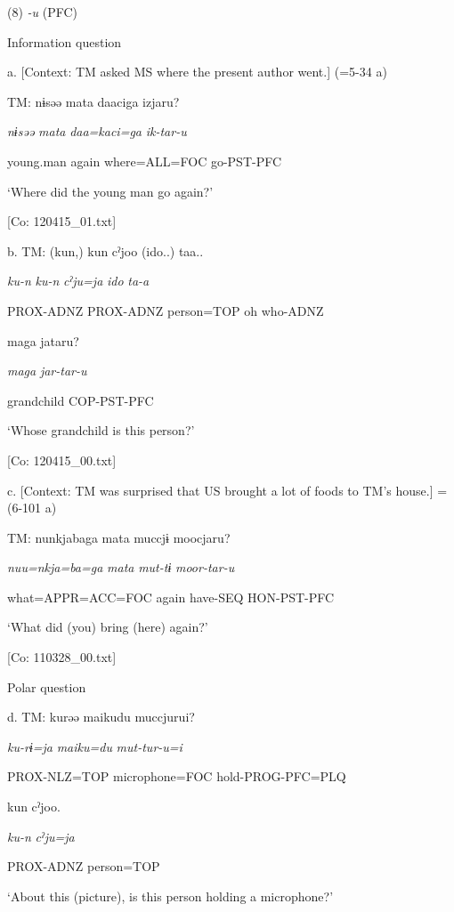 (8)  \textit{{}-u} (PFC)

  Information question

  a.  [Context: TM asked MS where the present author went.] (=5-34 a)

    TM:  nɨsəə  mata  daaciga  izjaru?

      \textit{nɨsəə}  \textit{mata}  \textit{daa=kaci=ga}  \textit{ik-tar-u}

      young.man  again  where=ALL=FOC  go-PST-PFC

      ‘Where did the young man go again?’

      [Co: 120415\_01.txt]

  b.  TM:  (kun,)  kun  cˀjoo  (ido..)  taa..

      \textit{ku-n}  \textit{ku-n}  \textit{cˀju=ja}  \textit{ido}  \textit{ta-a}

      PROX-ADNZ  PROX-ADNZ  person=TOP  oh  who-ADNZ

      maga  jataru?      

      \textit{maga}  \textit{jar-tar-u}      

      grandchild  COP-PST-PFC      

      ‘Whose grandchild is this person?’

      [Co: 120415\_00.txt]

  c.  [Context: TM was surprised that US brought a lot of foods to TM’s house.] = (6-101 a)

    TM:  nunkjabaga  mata  muccjɨ  moocjaru?

      \textit{nuu=nkja=ba=ga}  \textit{mata}  \textit{mut-tɨ}  \textit{moor-tar-u}

      what=APPR=ACC=FOC  again  have-SEQ  HON-PST-PFC

      ‘What did (you) bring (here) again?’

      [Co: 110328\_00.txt]

  Polar question

  d.  TM:  kurəə  {\textbar}maiku{\textbar}du  muccjurui?

      \textit{ku-rɨ=ja}  \textit{maiku=du}  \textit{mut-tur-u=i}

      PROX-NLZ=TOP  microphone=FOC  hold-PROG-PFC=PLQ

      kun  cˀjoo.  

      \textit{ku-n}  \textit{cˀju=ja}  

      PROX-ADNZ  person=TOP  

      ‘About this (picture), is this person holding a microphone?’

